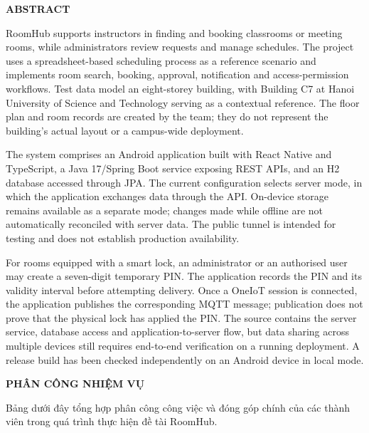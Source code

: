 \documentclass[../DoAn.tex]{subfiles}
\begin{document}
\begin{center}\bfseries\large ABSTRACT\end{center}
\vspace{0.5cm}
RoomHub supports instructors in finding and booking classrooms or meeting rooms, while administrators review requests and manage schedules. The project uses a spreadsheet-based scheduling process as a reference scenario and implements room search, booking, approval, notification and access-permission workflows. Test data model an eight-storey building, with Building C7 at Hanoi University of Science and Technology serving as a contextual reference. The floor plan and room records are created by the team; they do not represent the building's actual layout or a campus-wide deployment.

The system comprises an Android application built with React Native and TypeScript, a Java 17/Spring Boot service exposing REST APIs, and an H2 database accessed through JPA. The current configuration selects server mode, in which the application exchanges data through the API. On-device storage remains available as a separate mode; changes made while offline are not automatically reconciled with server data. The public tunnel is intended for testing and does not establish production availability.

For rooms equipped with a smart lock, an administrator or an authorised user may create a seven-digit temporary PIN. The application records the PIN and its validity interval before attempting delivery. Once a OneIoT session is connected, the application publishes the corresponding MQTT message; publication does not prove that the physical lock has applied the PIN. The source contains the server service, database access and application-to-server flow, but data sharing across multiple devices still requires end-to-end verification on a running deployment. A release build has been checked independently on an Android device in local mode.

\newpage

\begin{center}
    \Large{\textbf{PHÂN CÔNG NHIỆM VỤ}}\\
\end{center}

\vspace{0.8cm}

Bảng dưới đây tổng hợp phân công công việc và đóng góp chính của các thành viên trong quá trình thực hiện đề tài RoomHub.

\vspace{0.3cm}
\end{document}
